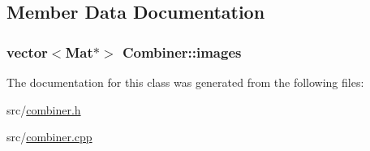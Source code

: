 \subsection{Member Data Documentation}
\hypertarget{class_combiner_abe68e0620c00e937b066a11ed3ce51dc}{
\subsubsection[{images}]{\setlength{\rightskip}{0pt plus 5cm}vector$<$Mat$\ast$$>$ {\bf Combiner::images}}}
\label{class_combiner_abe68e0620c00e937b066a11ed3ce51dc}


The documentation for this class was generated from the following files:\begin{DoxyCompactItemize}
\item 
src/\hyperlink{combiner_8h}{combiner.h}\item 
src/\hyperlink{combiner_8cpp}{combiner.cpp}\end{DoxyCompactItemize}

